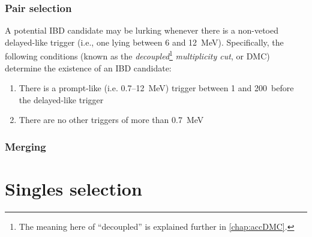 \documentclass[../thesis.tex]{subfiles}
\begin{document}
\subsubsection{Pair selection}
\label{sec:pairSel}

A potential IBD candidate may be lurking whenever there is a non-vetoed delayed-like trigger (i.e., one lying between 6 and 12~MeV). Specifically, the following conditions (known as the \emph{decoupled}\footnote{The meaning here of ``decoupled'' is explained further in \autoref{chap:accDMC}.} \emph{multiplicity cut}, or DMC) determine the existence of an IBD candidate:

\begin{enumerate}
\item There is a prompt-like (i.e. 0.7--12~MeV) trigger between 1 and 200~\us before the delayed-like trigger
\item There are no other triggers of more than 0.7~MeV
\end{enumerate}

\subsubsection{Merging}
\label{sec:selMergingTwo}

\section{Singles selection}
\label{sec:selSingles}
\end{document}
